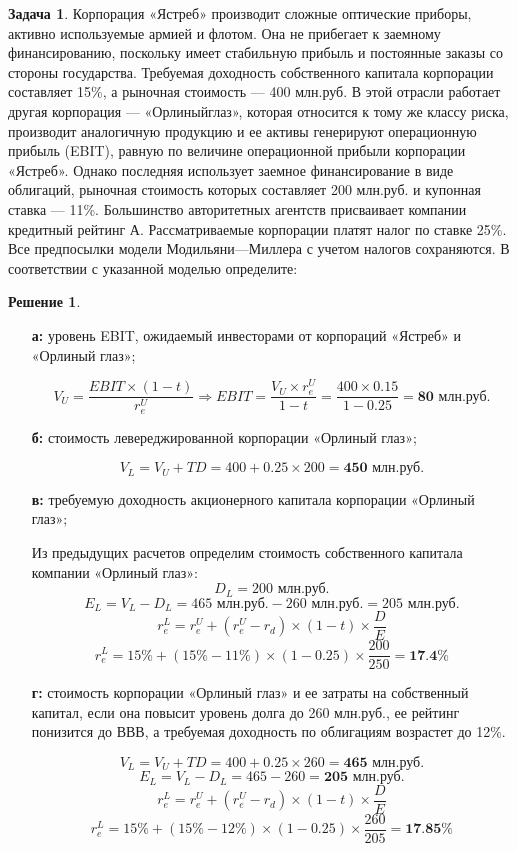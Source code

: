 \documentclass[a4paper, 14pt]{article}
\theoremstyle{plain} %
\theoremstyle{definition} %
\newtheorem*{solution}{Решение}
\newtheorem{problem}{Задача}[subsection]
\theoremstyle{remark} %
\begin{document}
\begin{problem}
	Корпорация «Ястреб» производит сложные оптические приборы, активно используемые армией и флотом. Она не прибегает к заемному финансированию, поскольку имеет стабильную прибыль и постоянные заказы со стороны государства. Требуемая доходность собственного капитала корпорации составляет 15\%, а рыночная стоимость — 400 млн.руб. В этой отрасли работает другая корпорация — «Орлиныйглаз», которая относится к тому же классу риска, производит аналогичную продукцию и ее активы генерируют операционную прибыль (EBIT), равную по величине операционной прибыли корпорации «Ястреб». Однако последняя использует заемное финансирование в виде облигаций, рыночная стоимость которых составляет 200 млн.руб. и купонная ставка — 11\%. Большинство авторитетных агентств присваивает компании кредитный рейтинг А. Рассматриваемые корпорации платят налог по ставке 25\%. Все предпосылки модели Модильяни—Миллера с учетом налогов сохраняются. В соответствии с указанной моделью определите:
	\begin{solution}
		\begin{itemize}
			\item[\textbf{а:}] уровень EBIT, ожидаемый инвесторами от корпораций «Ястреб» и «Орлиный глаз»;

			\[
				V_U = \frac{EBIT\times(1-t)}{r_e^U} \Rightarrow EBIT = \frac{V_U \times r_e^U}{1-t} = \frac{400 \times 0.15}{1 - 0.25} = \textbf{80 млн.руб.}
			\]

			\item[\textbf{б:}] стоимость левереджированной корпорации «Орлиный глаз»;

			\[
				V_L = V_U + TD = 400 + 0.25 \times 200 = \textbf{450 млн.руб.}
			\]
			\item[\textbf{в:}] требуемую доходность акционерного капитала корпорации «Орлиный глаз»;

			Из предыдущих расчетов определим стоимость собственного капитала компании «Орлиный глаз»:
			\[
				D_L = \text{200 млн.руб.}
			\]
			\[
				E_L = V_L - D_L = \text{465 млн.руб.} - \text{260 млн.руб.} = \text{205 млн.руб.}
			\]
			\[
				r_e^L = r_e^U + (r_e^U - r_d)\times(1-t)\times \frac{D}{E}
			\]
			\[
				r_e^L = 15\% + (15\% - 11\%)\times(1-0.25)\times \frac{200}{250} = \textbf{17.4\%}
			\]
			\item[\textbf{г:}] стоимость корпорации «Орлиный глаз» и ее затраты на собственный капитал, если она повысит уровень долга до 260 млн.руб., ее рейтинг понизится до ВВВ, а требуемая доходность по облигациям возрастет до 12\%.

			\[
				V_L = V_U + TD = 400 + 0.25 \times 260 = \textbf{465 млн.руб.}
			\]
			\[
				E_L = V_L - D_L = 465 - 260 = \textbf{205 млн.руб.}
			\]
			\[
				r_e^L = r_e^U + (r_e^U - r_d)\times(1-t)\times \frac{D}{E}
			\]
			\[
				r_e^L = 15\% + (15\% - 12\%)\times(1-0.25)\times \frac{260}{205} = \textbf{17.85\%}
			\]
		\end{itemize}
	\end{solution}
\end{problem}
\end{document}
